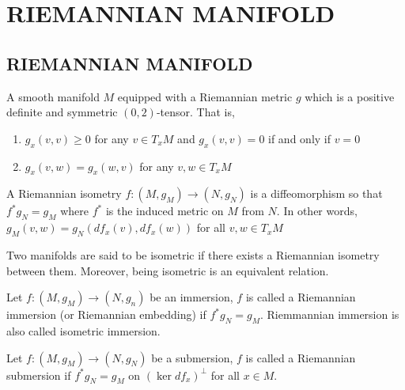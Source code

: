 \chapter{RIEMANNIAN MANIFOLD}

\section{RIEMANNIAN MANIFOLD}

\begin{definition}
	A smooth manifold $M$ equipped with a Riemannian metric $g$ which is a positive definite and symmetric $(0, 2)$-tensor. That is,
	\begin{enumerate}
		\item $g_x(v, v) \geq 0$ for any $v \in T_x M$ and $g_x(v, v) = 0$ if and only if $v = 0$
		\item $g_x(v, w) = g_x(w, v)$ for any $v, w \in T_x M$
	\end{enumerate}
\end{definition}

\begin{definition}
	A Riemannian isometry $f: (M, g_M) \to (N, g_N)$ is a diffeomorphism so that $f^* g_N = g_M$ where $f^*$ is the induced metric on $M$ from $N$. In other words, $g_M(v, w) = g_N(df_x(v), df_x(w))$ for all $v, w \in T_x M$
	\begin{center}
	\end{center}
	
	Two manifolds are said to be isometric if there exists a Riemannian isometry between them. Moreover, being isometric is an equivalent relation.
\end{definition}

\begin{definition}
	Let $f: (M, g_M) \to (N, g_n)$ be an immersion, $f$ is called a Riemannian immersion (or Riemannian embedding) if $f^* g_N = g_M$. Riemmannian immersion is also called isometric immersion.
\end{definition}

\begin{definition}
	Let $f: (M, g_M) \to (N, g_N)$ be a submersion, $f$ is called a Riemannian submersion if  $f^* g_N = g_M$ on $(\ker df_x)^\perp$ for all $x \in M$.
\end{definition}

